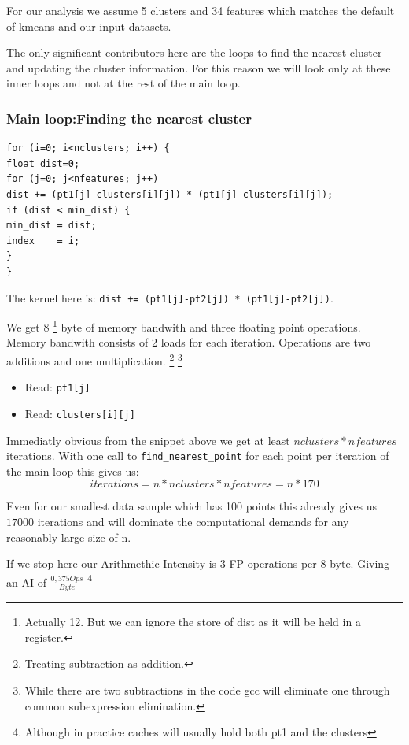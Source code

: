 For our analysis we assume 5 clusters and 34 features which matches
the default of kmeans and our input datasets.

The only significant contributors here are the loops to find the nearest cluster and updating the cluster information.
For this reason we will look only at these inner loops and not at the rest of the main loop.


\subsubsection{Main loop:Finding the nearest cluster}
\begin{lstlisting}[caption={Inlined representation of find\_nearest\_point}]
for (i=0; i<nclusters; i++) {
float dist=0;
for (j=0; j<nfeatures; j++)
dist += (pt1[j]-clusters[i][j]) * (pt1[j]-clusters[i][j]);
if (dist < min_dist) {
min_dist = dist;
index    = i;
}
}
\end{lstlisting}
The kernel here is: \texttt{dist += (pt1[j]-pt2[j]) * (pt1[j]-pt2[j])}.\newline

We get 8
\footnote{Actually 12. But we can ignore the store of dist as it will be held in a register.}
byte of memory bandwith and three floating point operations.
Memory bandwith consists of 2 loads for each iteration.
Operations are two additions and one multiplication.
\footnote{Treating subtraction as addition.}
\footnote{While there are two subtractions in the code gcc will eliminate one through common subexpression elimination.}
\begin{itemize}
	\item Read: \texttt{pt1[j]}
	\item Read: \texttt{clusters[i][j]}
\end{itemize}

Immediatly obvious from the snippet above we get at least $nclusters * nfeatures$ iterations.
With one call to \texttt{find\_nearest\_point} for each point per iteration of the main loop this gives us:\\
$$iterations = n * nclusters * nfeatures = n * 170$$

Even for our smallest data sample which has 100 points this already gives us $17000$ iterations and will dominate the computational demands for any reasonably large size of n.

If we stop here our Arithmethic Intensity is 3 FP operations per 8 byte. Giving an AI of $\frac{0,375 Ops}{Byte}$
\footnote{Although in practice caches will usually hold both pt1 and the clusters}


